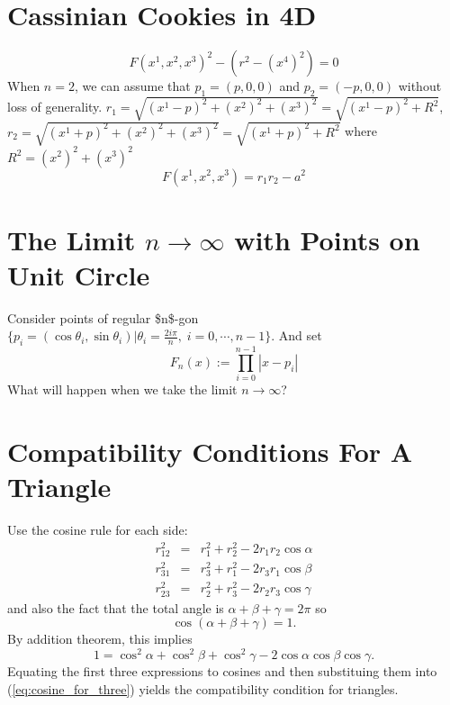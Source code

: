 \documentclass{article}
\begin{document}
\section{Cassinian Cookies in 4D}
\label{sec:org0f3709b}
\begin{equation}
\label{}
F(x^1,x^2,x^3)^2 - ( r^2 - (x^4)^2) = 0 
\end{equation}
When \(n=2\), we can assume that \(p_1 = (p,0,0)\) and \(p_2 = (-p,0,0)\) without loss of generality. 
\(r_1= \sqrt{(x^1-p)^2 + (x^2)^2 + (x^3)^2}= \sqrt{(x^1-p)^2 + R^2}\), \(r_2 = \sqrt{(x^1+p)^2 + (x^2)^2 +  (x^3)^2}= \sqrt{(x^1+p)^2 + R^2}\) where \(R^2 = (x^2)^2 + (x^3)^2\)
\begin{equation}
\label{}
F(x^1,x^2,x^3)= r_1r_2 -a^2
\end{equation}

\section{The Limit \(n \to \infty\) with Points on Unit Circle}
\label{sec:orgf24bc56}
Consider points of regular \$n\$-gon \(\{p_i=(\cos{\theta_i,\sin{\theta_i}})| \theta_i = \frac{2i\pi}{n}, \; i = 0,\cdots,n-1\}\). And set
\begin{equation}
\label{ }
F_n(x) := \prod_{i=0}^{n-1}|x-p_i|
\end{equation}
What will happen when we take the limit \(n \to \infty\)?
\appendix
\section{Compatibility Conditions For A Triangle}
\label{sec:orgbed7e70}
Use the cosine rule for each side:
\begin{eqnarray}
r_{12}^2 & = & r_1^2 + r_2^2 - 2r_1r_2\cos{\alpha} \\
r_{31}^2 & = & r_3^2 + r_1^2 - 2r_3r_1\cos{\beta} \\
r_{23}^2 & = & r_2^2 + r_3^2 - 2r_2r_3\cos{\gamma} 
\end{eqnarray}
and also the fact that the total angle is \(\alpha + \beta +\gamma = 2\pi\) so
\begin{equation}
\label{ }
\cos{(\alpha + \beta +\gamma)} = 1.
\end{equation}
By addition theorem, this implies
\begin{equation}
\label{eq:cosine_for_three}
1= \cos^2{\alpha} + \cos^2{\beta} + \cos^2{\gamma} -2 \cos{\alpha} \cos{\beta} \cos{\gamma}.
\end{equation}
Equating the first three expressions to cosines and then substituing them into (\ref{eq:cosine_for_three}) yields the compatibility condition for triangles.
\end{document}
